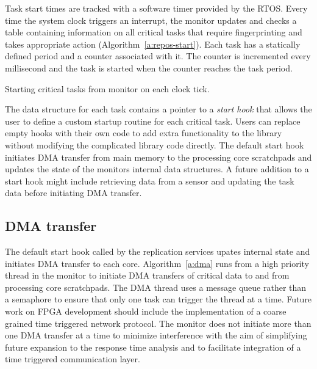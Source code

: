 	Task start times are tracked with a software timer provided by the RTOS. 
	Every time the system clock triggers an interrupt, the monitor updates and checks a table containing information on all critical tasks that require fingerprinting and takes appropriate action (Algorithm~\ref{a:repos-start}).
	Each task has a statically defined period and a counter associated with it. 
	The counter is incremented every millisecond and the task is started when the counter reaches the task period.

\begin{algorithm}
\caption{Starting critical tasks from monitor on each clock tick.}
\label{a:repos-start}
\end{algorithm}	

	The data structure for each task contains a pointer to a \emph{start hook} that allows the user to define a custom startup routine for each critical task.
	Users can replace empty hooks with their own code to add extra functionality to the library without modifying the complicated library code directly. 
	The default start hook initiates DMA transfer from main memory to the processing core scratchpads and updates the state of the monitors internal data structures.
	A future addition to a start hook might include retrieving data from a sensor and updating the task data before initiating DMA transfer.		



\subsection{DMA transfer}
\label{s:dma-trans}
	The default start hook called by the replication services upates internal state and initiates DMA transfer to each core. 
	Algorithm~\ref{a:dma} runs from a high priority thread in the monitor to initiate DMA transfers of critical data to and from processing core scratchpads.
	The DMA thread uses a message queue rather than a semaphore to ensure that only one task can trigger the thread at a time.
	Future work on FPGA development should include the implementation of a coarse grained time triggered network protocol. 
	The monitor does not initiate more than one DMA transfer at a time to minimize interference with the aim of simplifying future expansion to the response time analysis and to facilitate integration of a time triggered communication layer.

